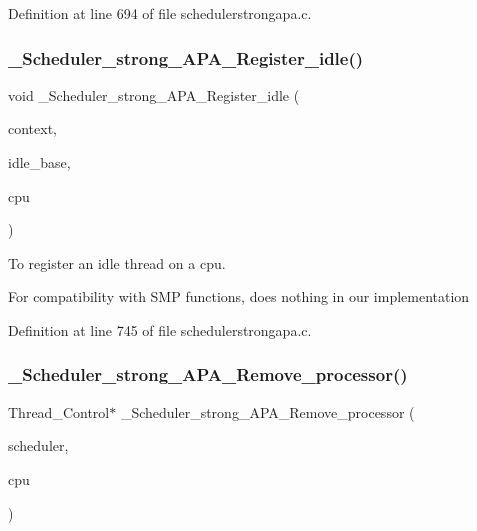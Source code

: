 Definition at line 694 of file schedulerstrongapa.\+c.

\mbox{\label{group__RTEMSScoreSchedulerStrongAPA_gad0d503dce329bd77203ea47397bb7e9d}} 
\subsubsection{\texorpdfstring{\+\_\+\+Scheduler\+\_\+strong\+\_\+\+A\+P\+A\+\_\+\+Register\+\_\+idle()}{\_Scheduler\_strong\_APA\_Register\_idle()}}
{\footnotesize\ttfamily void \+\_\+\+Scheduler\+\_\+strong\+\_\+\+A\+P\+A\+\_\+\+Register\+\_\+idle (\begin{DoxyParamCaption}\item[{Scheduler\+\_\+\+Context $\ast$}]{context,  }\item[{Scheduler\+\_\+\+Node $\ast$}]{idle\+\_\+base,  }\item[{Per\+\_\+\+C\+P\+U\+\_\+\+Control $\ast$}]{cpu }\end{DoxyParamCaption})}



To register an idle thread on a cpu. 

For compatibility with S\+MP functions, does nothing in our implementation 

Definition at line 745 of file schedulerstrongapa.\+c.

\mbox{\label{group__RTEMSScoreSchedulerStrongAPA_ga91dc29dcdeea35e3329623be7a798e39}} 
\subsubsection{\texorpdfstring{\+\_\+\+Scheduler\+\_\+strong\+\_\+\+A\+P\+A\+\_\+\+Remove\+\_\+processor()}{\_Scheduler\_strong\_APA\_Remove\_processor()}}
{\footnotesize\ttfamily Thread\+\_\+\+Control$\ast$ \+\_\+\+Scheduler\+\_\+strong\+\_\+\+A\+P\+A\+\_\+\+Remove\+\_\+processor (\begin{DoxyParamCaption}\item[{const Scheduler\+\_\+\+Control $\ast$}]{scheduler,  }\item[{Per\+\_\+\+C\+P\+U\+\_\+\+Control $\ast$}]{cpu }\end{DoxyParamCaption})}



